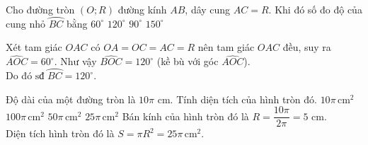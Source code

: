\begin{ex}%
 Cho đường tròn $(O;R)$ đường kính $AB$, dây cung $AC=R$. Khi đó số đo độ của cung nhỏ $\wideparen{BC}$ bằng
 \choice
  {$60^\circ$}
  {\True $120^\circ$}
  {$90^\circ$}
  {$150^\circ$}
 \loigiai
  {
  \immini
  {
  Xét tam giác $OAC$ có $OA=OC=AC=R$ nên tam giác $OAC$ đều, suy ra $\widehat{AOC}=60^\circ$. Như vậy $\widehat{BOC} = 120^\circ$ (kề bù với góc $\widehat{AOC}$).\\
  Do đó $\text{sđ }\wideparen{BC} = 120^\circ$.
  }
  {
  }
  }
\end{ex}

\begin{ex}%
 Độ dài của một đường tròn là $10\pi$ cm. Tính diện tích của hình tròn đó.
 \choice
  {$10\pi \,\mathrm{cm}^2$}
  {$100\pi \,\mathrm{cm}^2$}
  {$50\pi \,\mathrm{cm}^2$}
  {\True $25\pi \,\mathrm{cm}^2$}
 \loigiai
  {
  Bán kính của hình tròn đó là $R = \dfrac{10\pi}{2\pi} = 5$ cm.\\
  Diện tích hình tròn đó là $S = \pi R^2 = 25\pi \, \mathrm{cm}^2$.
  }
\end{ex}

